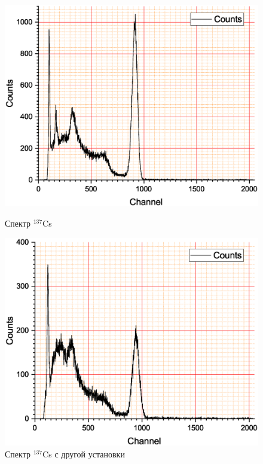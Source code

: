 \documentclass[a4paper]{article}
\begin{document}
\begin{figure}
\begin{center}
\begin{minipage}{0.49\linewidth}
			\includegraphics[width=1\linewidth]{cs.eps}
			\caption{Спектр $^{137}$Cs} %
		\end{minipage}
		\hfill 
		\begin{minipage}{0.49\linewidth}
			\includegraphics[width=1\linewidth]{cs_diff.eps}
			\caption{Спектр $^{137}$Cs с другой установки}
			\label{ris:xperimcode}
		\end{minipage}
	\end{center}
\end{figure}
\end{document}
